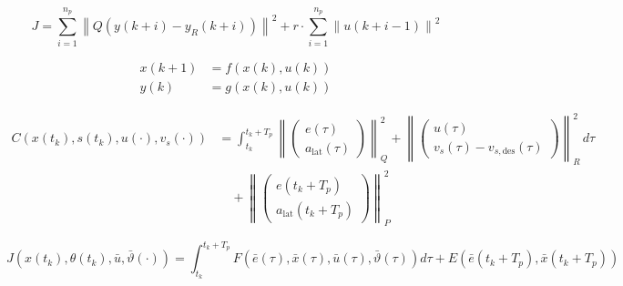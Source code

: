 \begin{equation}
    J = \sum_{i=1}^{n_p} \left\| Q \left( y(k+i) - y_R(k+i) \right) \right\|^2 + r \cdot \sum_{i=1}^{n_p} \left\| u(k+i-1) \right\|^2
\end{equation}

\begin{align}
    x(k+1)  &= f(x(k), u(k)) \\
    y(k)    &= g(x(k), u(k))
\end{align}

\begin{equation}
    \begin{aligned}
    C(x(t_k), s(t_k), u(\cdot), v_s(\cdot)) &= \int_{t_k}^{t_k + T_p} \left\| 
    \begin{pmatrix}
    e(\tau) \\
    a_{\text{lat}}(\tau)
    \end{pmatrix}
    \right\|_Q^2 + \left\| 
    \begin{pmatrix}
    u(\tau) \\
    v_s(\tau) - v_{s, \text{des}}(\tau)
    \end{pmatrix}
    \right\|_R^2 \, d\tau \\
    &\quad + \left\| 
    \begin{pmatrix}
    e(t_k + T_p) \\
    a_{\text{lat}}(t_k + T_p)
    \end{pmatrix}
    \right\|_P^2
    \end{aligned}
\end{equation}

\begin{equation}
    J(x(t_k),\theta(t_k),\bar{u},\bar{\vartheta}(\cdot)) = \int_{t_k}^{t_k + T_p} F(\bar{e}(\tau),\bar{x}(\tau),\bar{u}(\tau),\bar{\vartheta}(\tau))d\tau + E(\bar{e}(t_k+T_p),\bar{x}(t_k+T_p))
\end{equation}